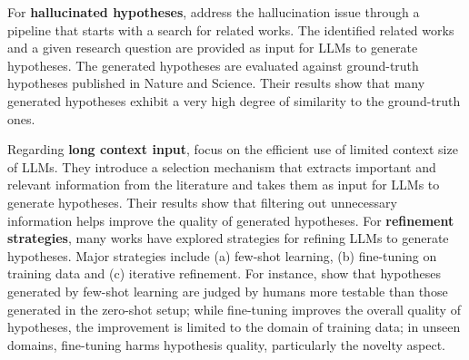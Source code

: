     For \textbf{hallucinated hypotheses}, %
    \citet{yang2024moose} address the hallucination issue
    through a pipeline that starts with a search for related works. The identified related works and a given research question are provided as input for LLMs to generate hypotheses.
    The generated hypotheses are evaluated against ground-truth hypotheses published in Nature and Science. Their results show that many generated hypotheses exhibit a very high degree of similarity to the ground-truth ones. %
    \iffalse
    \citet{xiong2024improving} ground LLM-integrated formation of research hypotheses in scientific knowledge bases. Their approach incorporates external, structured data from knowledge graphs into the hypothesis formation process, and leverages the idea of structured reasoning to 
    knowledge-grounded hypotheses, i.e., leveraging the search for evidence to mitigate hallucination during hypothesis formation.
    \fi
    Regarding \textbf{long context input},
    \citet{chai2024exploring} focus on the efficient use of limited context size of LLMs. They introduce a selection mechanism that extracts important and relevant information from the literature and takes them as input for LLMs to generate hypotheses. Their results show that filtering out unnecessary information helps improve the quality of generated hypotheses.
    For \textbf{refinement strategies}, many works have explored strategies for refining LLMs to generate hypotheses. Major strategies include (a) few-shot learning, (b) fine-tuning on training data and (c) iterative refinement. For instance, 
    \citet{qi2023large} 
    show that hypotheses generated by few-shot learning
    are judged by humans more testable than those generated in the zero-shot setup; while fine-tuning improves the overall quality of hypotheses, the improvement is limited to the domain of training data; in unseen domains, fine-tuning harms hypothesis quality, particularly the novelty aspect.  
